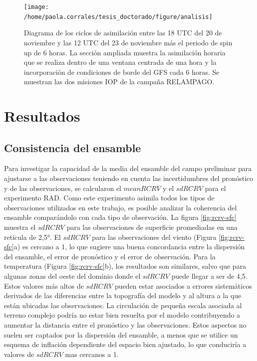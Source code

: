 \documentclass[12pt,oneside,a4paper]{reedthesis}
\begin{document}
\begin{figure}
\texttt{[image: /home/paola.corrales/tesis\_doctorado/figure/analisis]} \caption{Diagrama de los ciclos de asimilación entre las 18 UTC del 20 de noviembre y las 12 UTC del 23 de noviembre más el periodo de spin up de 6 horas. La sección ampliada muestra la asimilación horaria que se realiza dentro de una ventana centrada de una hora y la incorporación de condiciones de borde del GFS cada 6 horas. Se muestran las dos misiones IOP de la campaña RELAMPAGO.}\label{fig:cycle}
\end{figure}
\hypertarget{resultados}{%
\section{Resultados}\label{resultados}}

\hypertarget{consistencia-del-ensamble}{%
\subsection{Consistencia del ensamble}\label{consistencia-del-ensamble}}

Para investigar la capacidad de la media del ensamble del campo preliminar para ajustarse a las observaciones teniendo en cuenta las incertidumbres del pronóstico y de las observaciones, se calcularon el \(meanRCRV\) y el \(sdRCRV\) para el experimento RAD. Como este experimento asimila todos los tipos de observaciones utilizados en este trabajo, es posible analizar la coherencia del ensamble comparándolo con cada tipo de observación. La figura \ref{fig:rcrv-sfc} muestra el \(sdRCRV\) para las observaciones de superficie promediadas en una retícula de 2,5°. El \(sdRCRV\) para las observaciones del viento (Figura \ref{fig:rcrv-sfc}a) es cercano a 1, lo que sugiere una buena concordancia entre la dispersión del ensamble, el error de pronóstico y el error de observación. Para la temperatura (Figura \ref{fig:rcrv-sfc}b), los resultados son similares, salvo que para algunas zonas del oeste del dominio donde el \(sdRCRV\) puede llegar a ser de 4,5. Estos valores más altos de \(sdRCRV\) pueden estar asociados a errores sistemáticos derivados de las diferencias entre la topografía del modelo y al altura a la que están ubicadas las observaciones. La circulación de pequeña escala asociada al terreno complejo podría no estar bien resuelta por el modelo contribuyendo a aumentar la distancia entre el pronóstico y las observaciones. Estos aspectos no suelen ser captados por la dispersión del ensamble, a menos que se utilice un esquema de inflación dependiente del espacio bien ajustado, lo que conduciría a valores de \(sdRCRV\) mas cercanos a 1.
\end{document}
